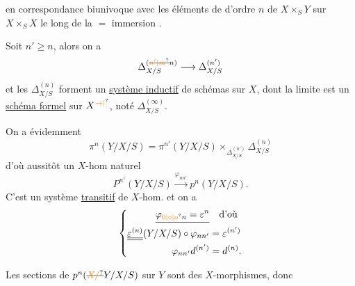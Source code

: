 en correspondance biunivoque avec les éléments de  d'ordre $n$ de $X\times_S Y$  sur $X\times_S X$ le long de la $=$ immersion \unsure{\ldots|{}}. \deleted{\unsure{$\Gamma_\varphi$}}

Soit $n'\geq n$, alors on a
\[
\Delta^{(\deleted{\unsure{n'|m}}n)}_{X/S}\longrightarrow\Delta^{(n')}_{X/S}
\]
et les $\Delta^{(n)}_{X/S}$ forment un \uline{système inductif} de schémas sur $X$, dont la limite est un \uline{schéma formel} sur $X^{\unsure{\to|{}}}$, noté $\Delta^{(\infty)}_{X/S}$.

On a évidemment
\[
\pi^n(Y/X/S)=\pi^{n'}(Y/X/S)\times_{\Delta^{(n')}_{X/S}}\Delta^{(n)}_{X/S}
\]
d'où aussitôt un $X$-hom naturel
\[
P^{n'}(Y/X/S)\xrightarrow{\varphi_{nn'}}p^n(Y/X/S).
\]
C'est un système \uline{transitif} de $X$-hom. et on a \deleted{$\unsure{\varphi}$}
\[
\left\{\begin{aligned}
\underline{\varphi_{\unsure{0|\circ|o}n}=\varepsilon^n}&\quad\text{d'où}\\
\underline{\underline{\varepsilon^{(n)}}}(Y/X/S)\circ\varphi_{nn'}&=\varepsilon^{(n')}\\
\varphi_{nn'}d^{(n')}&=d^{(n)}.
\end{aligned}\right.
\]

Les sections de $p^n(\deleted{\unsure{X/}}Y/X/S)$ sur $Y$ sont des $X$-morphismes, donc


